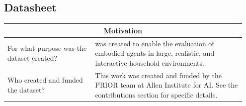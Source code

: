 \pagebreak

\subsection{Datasheet}
\label{sec:eli-datasheet}

\begin{longtable}{p{0.35\linewidth} |p{0.6\linewidth} }
    \bottomrule
        \multicolumn{2}{c}{\rule{0in}{0.2in}\textbf{Motivation}\vspace{0.10in}}\\
    \toprule
     For what purpose was the dataset created? & \elienv{} was created to enable the evaluation of embodied agents in large, realistic, and interactive household environments.\\[0.15in]
     \midrule
     Who created and funded the dataset? &
     This work was created and funded by the PRIOR team at Allen Institute for AI. See the contributions section for specific details.\\
     

\end{longtable}
